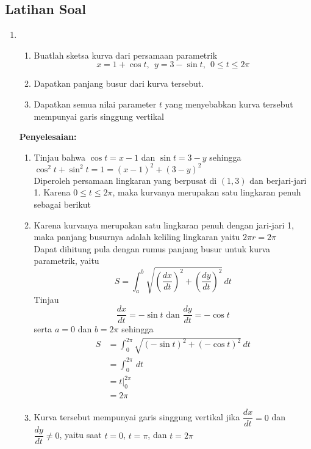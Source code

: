 \documentclass{article}
\begin{document}
\subsection{Latihan Soal}
\begin{enumerate}
	\item \begin{enumerate}
		\item Buatlah sketsa kurva dari persamaan parametrik 
		$$ x=1+\cos t, ~~ y=3-\sin t, ~~ 0\leq t\leq 2\pi $$
		\item Dapatkan panjang busur dari kurva tersebut.
		\item Dapatkan semua nilai parameter $t$ yang menyebabkan kurva tersebut mempunyai garis singgung vertikal 
	\end{enumerate}
	\textbf{Penyelesaian:}
	\begin{enumerate}
		\item Tinjau bahwa $\cos t=x-1$ dan $\sin t=3-y$ sehingga $\cos^2 t+\sin^2 t =1=(x-1)^2+(3-y)^2$ \\Diperoleh persamaan lingkaran yang berpusat di $(1,3)$ dan berjari-jari 1. Karena $0\leq t\leq 2\pi$, maka kurvanya merupakan satu lingkaran penuh sebagai berikut
		\begin{center}
	\end{center}
	\item Karena kurvanya merupakan satu lingkaran penuh dengan jari-jari 1, maka panjang busurnya adalah keliling lingkaran yaitu $2\pi r=2\pi$\\
	Dapat dihitung pula dengan rumus panjang busur untuk kurva parametrik, yaitu 
	$$ S=\int_a^b \sqrt{\left(\dfrac{dx}{dt}\right)^2+\left(\dfrac{dy}{dt}\right)^2}\, dt $$ 
	Tinjau 
	$$ \dfrac{dx}{dt} = -\sin t \text{   dan   } \dfrac{dy}{dt}=-\cos t $$
	serta $a=0$ dan $b=2\pi$ sehingga 
	\begin{align*}
	S &= \int_0^{2\pi}\sqrt{(-\sin t)^2+(-\cos t)^2}\, dt\\
	&= \int_0^{2\pi}\, dt\\
	&= t\big|_0^{2\pi}\\
	&= 2\pi 
	\end{align*}
	\item Kurva tersebut mempunyai garis singgung vertikal jika $\dfrac{dx}{dt}=0$ dan $\dfrac{dy}{dt}\neq 0$, yaitu saat $t=0$, $t=\pi$, dan $t=2\pi$

\end{enumerate}
\end{enumerate}
\end{document}
